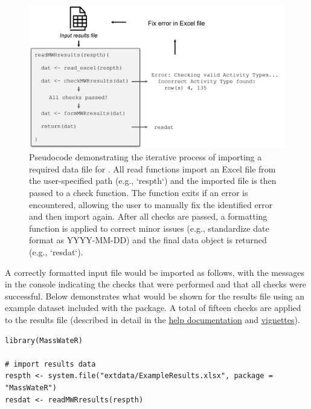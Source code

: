 \begin{figure}
\includegraphics[width=1\linewidth]{figs/importflow} \caption{Pseudocode demonstrating the iterative process of importing a required data file for .  All read functions import an Excel file from the user-specified path (e.g., `respth`) and the imported file is then passed to a check function.  The function exits if an error is encountered, allowing the user to manually fix the identified error and then import again.  After all checks are passed, a formatting function is applied to correct minor issues (e.g., standardize date format as YYYY-MM-DD) and the final data object is returned (e.g., `resdat`).}\label{fig:importflow}
\end{figure}

A correctly formatted input file would be imported as follows, with the messages in the console indicating the checks that were performed and that all checks were successful. Below demonstrates what would be shown for the results file using an example dataset included with the package. A total of fifteen checks are applied to the results file (described in detail in the \href{https://massbays-tech.github.io/MassWateR/reference/checkMWRresults.html}{help documentation} and \href{https://massbays-tech.github.io/MassWateR/articles/inputs.html\#surface-water-quality-results}{vignettes}).

\begin{verbatim}
library(MassWateR)

# import results data
respth <- system.file("extdata/ExampleResults.xlsx", package = "MassWateR")
resdat <- readMWRresults(respth)
\end{verbatim}

